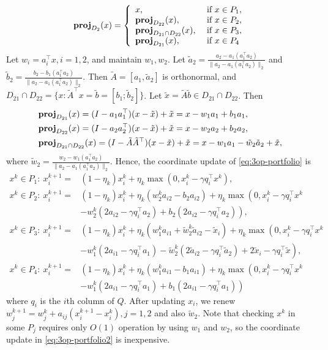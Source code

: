 $$\prj_{D_2}(x)=\left\{
\begin{array}{ll}
x, & \text{ if }x\in P_1,\\
\prj_{D_{22}}(x), &\text{ if }x\in P_2,\\
\prj_{D_{21}\cap D_{22}}(x), & \text{ if }x\in P_3,\\
\prj_{D_{21}}(x), & \text{ if }x\in P_4
\end{array}
\right.$$ 
Let $w_i=a_i^\top x, i=1,2$, and maintain $w_1,w_2$. Let $\tilde{a}_2=\frac{a_2-a_1(a_1^\top a_2)}{\|a_2-a_1(a_1^\top a_2)\|_2}$ and $\tilde{b}_2=\frac{b_2-b_1(a_1^\top a_2)}{\|a_2-a_1(a_1^\top a_2)\|_2}$. Then $\tilde{A}=[a_1,\tilde{a}_2]$ is orthonormal, and $D_{21}\cap D_{22}=\{x: \tilde{A}^\top x=\tilde{b}=[b_1;\tilde{b}_2]\}$. Let $\tilde{x}=\tilde{A}\tilde{b}\in D_{21}\cap D_{22}$. Then 
\begin{align*}
&\prj_{D_{21}}(x)=(I-a_1a_1^\top)(x-\tilde{x})+\tilde{x}=x-w_1a_1+b_1a_1,\\
&\prj_{D_{22}}(x)=(I-a_2a_2^\top)(x-\tilde{x})+\tilde{x}=x-w_2a_2+b_2a_2,\\
&\prj_{D_{21}\cap D_{22}}(x)=(I-\tilde{A}\tilde{A}^\top)(x-\tilde{x})+\tilde{x}=x-w_1 a_1-\tilde{w}_2\tilde{a}_2+\tilde{x},
\end{align*}
where $\tilde{w}_2=\frac{w_2-w_1(a_1^\top a_2)}{\|a_2-a_1(a_1^\top a_2)\|_2}$.
Hence, the coordinate update of \eqref{eq:3op-portfolio} is
\begin{subequations}\label{eq:3op-portfolio2}
\begin{align}
x^k\in P_1:\ x_i^{k+1}= & (1-\eta_k)x_i^k+\eta_k\max(0, x_i^k-\gamma q_i^\top x^k),\\
x^k\in P_2:\  x_i^{k+1}= & (1-\eta_k)x_i^k+\eta_k(w_2^ka_{i2}-b_2a_{i2})+\eta_k\max\left(0, x_i^k-\gamma q_i^\top x^k\right.\nonumber\\
&\left.-w_2^k(2a_{i2}-\gamma q_i^\top a_2)+b_2(2a_{i2}-\gamma q_i^\top a_2)\right),\\
x^k\in P_3:\ x_i^{k+1}= & (1-\eta_k)x_i^k+\eta_k\left(w_1^k a_{i1}+\tilde{w}_2^k\tilde{a}_{i2}-\tilde{x}_i\right)+\eta_k\max\left(0,x_i^k-\gamma q_i^\top x^k\right.\nonumber\\
&\left.-w_1^k (2a_{i1}-\gamma q_i^\top a_1)-\tilde{w}_2^k(2\tilde{a}_{i2}-\gamma q_i^\top \tilde{a}_2)+2\tilde{x}_i-\gamma q_i^\top \tilde{x}\right),\\
x^k\in P_4:\ x_i^{k+1}= & (1-\eta_k)x_i^k+\eta_k(w_1^ka_{i1}-b_1a_{i1})+\eta_k\max\left(0, x_i^k-\gamma q_i^\top x^k\right.\nonumber\\
&\left.-w_1^k(2a_{i1}-\gamma q_i^\top a_1)+b_1(2a_{i1}-\gamma q_i^\top a_1)\right)
\end{align}
\end{subequations}
where $q_i$ is the $i$th column of $Q$. After updating $x_i$, we renew $w_j^{k+1}=w_j^k+a_{ij}(x_i^{k+1}-x_i^k), j=1,2$ and also $\tilde{w}_2$. Note that checking $x^k$ in some $P_j$ requires only $O(1)$ operation by using $w_1$ and $w_2$, so the coordinate update in \eqref{eq:3op-portfolio2} is inexpensive.

 
 
